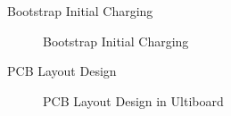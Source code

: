 \begin{frame}{Bootstrap Initial Charging}
	\begin{figure}
		\centering


		\caption{Bootstrap Initial Charging}
	\end{figure}
\end{frame}

\begin{frame}{PCB Layout Design}
	\begin{figure}
		\centering


		\caption{PCB Layout Design in Ultiboard}
	\end{figure}
\end{frame}

